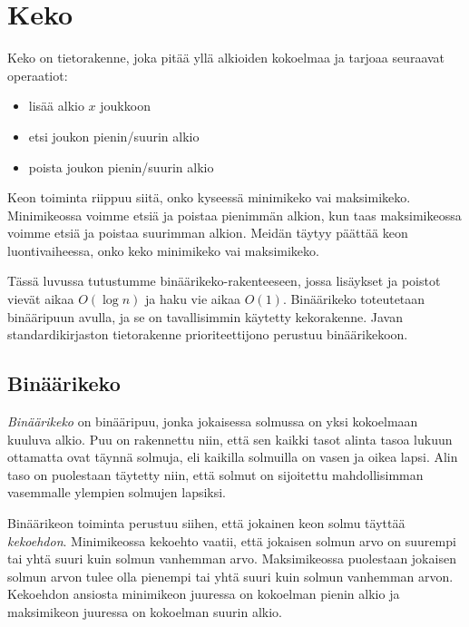 \chapter{Keko}

Keko on tietorakenne, joka pitää yllä alkioiden kokoelmaa
ja tarjoaa seuraavat operaatiot:

\begin{itemize}
\item lisää alkio $x$ joukkoon
\item etsi joukon pienin/suurin alkio
\item poista joukon pienin/suurin alkio
\end{itemize}

Keon toiminta riippuu siitä, onko kyseessä minimikeko
vai maksimikeko.
Minimikeossa voimme etsiä ja poistaa pienimmän alkion,
kun taas maksimikeossa voimme etsiä ja poistaa suurimman alkion.
Meidän täytyy päättää keon luontivaiheessa,
onko keko minimikeko vai maksimikeko.

Tässä luvussa tutustumme binäärikeko-rakenteeseen,
jossa lisäykset ja poistot vievät aikaa $O(\log n)$
ja haku vie aikaa $O(1)$.
Binäärikeko toteutetaan binääripuun avulla,
ja se on tavallisimmin käytetty kekorakenne.
Javan standardikirjaston tietorakenne prioriteettijono
perustuu binäärikekoon.

\section{Binäärikeko}

\emph{Binäärikeko} on binääripuu, jonka jokaisessa solmussa on
yksi kokoelmaan kuuluva alkio.
Puu on rakennettu niin, että sen kaikki tasot alinta
tasoa lukuun ottamatta ovat täynnä solmuja,
eli kaikilla solmuilla on vasen ja oikea lapsi.
Alin taso on puolestaan täytetty niin,
että solmut on sijoitettu mahdollisimman vasemmalle
ylempien solmujen lapsiksi.

Binäärikeon toiminta perustuu siihen,
että jokainen keon solmu täyttää \emph{kekoehdon}.
Minimikeossa kekoehto vaatii, että jokaisen
solmun arvo on suurempi tai yhtä suuri kuin solmun vanhemman arvo.
Maksimikeossa puolestaan jokaisen solmun arvon tulee olla
pienempi tai yhtä suuri kuin solmun vanhemman arvon.
Kekoehdon ansiosta minimikeon juuressa on kokoelman
pienin alkio ja maksimikeon juuressa on kokoelman suurin alkio.

